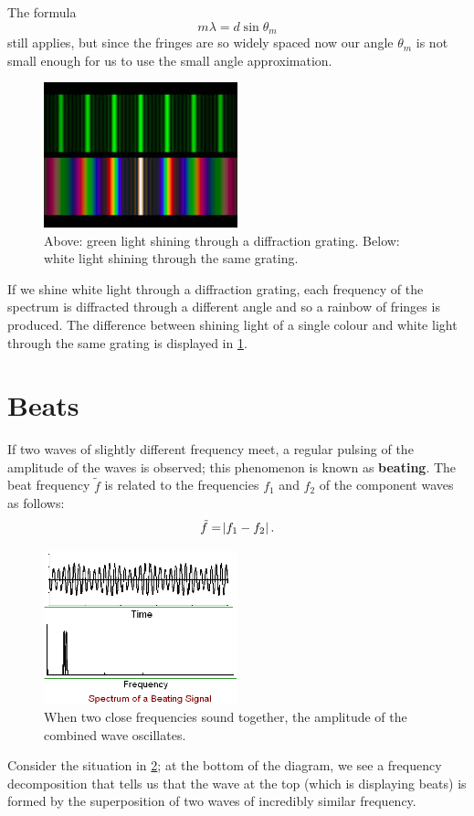 \documentclass[a4paper]{amsbook}
\theoremstyle{definition}
\numberwithin{exercise}{chapter}
\numberwithin{exercise}{chapter}
\begin{document}
The formula
\begin{displaymath}
  m \lambda = d \sin \theta_m
\end{displaymath}
still applies, but since the fringes are so widely spaced now our angle $ \theta_m $ is not small enough for us to use the small
angle approximation.

\begin{figure}
  \centering
  \includegraphics[width=0.5\textwidth]{whitediff}
  \caption{Above: green light shining through a diffraction grating. Below: white light shining through the same grating.}\label{fig:whitediff}
\end{figure}
If we shine white light through a diffraction grating, each frequency of the spectrum is diffracted through a different angle and
so a rainbow of fringes is produced. The difference between shining light of a single colour and white light through the same grating
is displayed in \cref{fig:whitediff}.

\section{Beats}
If two waves of slightly different frequency meet, a regular pulsing of the amplitude of the waves is observed; this phenomenon is
known as \textbf{beating}. The beat frequency $ \tilde{f} $ is related to the frequencies $ f_1 $ and $ f_2 $ of the component waves as follows:
\begin{equation}
  \tilde{f} = \abs{f_1 - f_2}.
\end{equation}

\begin{figure}
  \centering
  \includegraphics[width=0.5\textwidth]{beats}
  \caption{When two close frequencies sound together, the amplitude of the combined wave oscillates.}\label{fig:beats}
\end{figure}
Consider the situation in \cref{fig:beats}; at the bottom of the diagram, we see a frequency decomposition that tells
us that the wave at the top (which is displaying beats) is formed by the superposition of two waves of incredibly similar
frequency.
\end{document}
